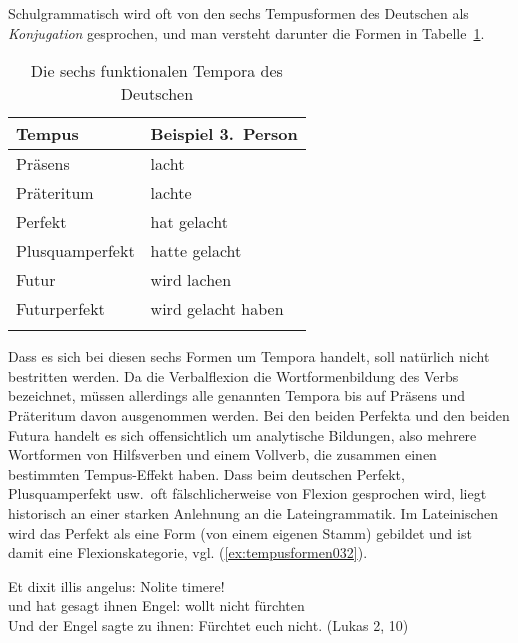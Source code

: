 Schulgrammatisch wird oft von den sechs Tempusformen des Deutschen als \textit{Konjugation} gesprochen, und man versteht darunter \idR die Formen in Tabelle~\ref{tab:tempusformen031}.

\begin{table}[!htbp]
  \centering
  \begin{tabular}{ll}
    \lsptoprule
    \textbf{Tempus} & \textbf{Beispiel 3.~Person}\\
    \midrule
    Präsens & lacht \\
    Präteritum & lachte \\
    Perfekt & hat gelacht \\
    Plusquamperfekt & hatte gelacht \\
    Futur & wird lachen \\
    Futurperfekt & wird gelacht haben \\
    \lspbottomrule
  \end{tabular}
  \caption{Die sechs funktionalen Tempora des Deutschen}
  \label{tab:tempusformen031}
\end{table}

Dass es sich bei diesen sechs Formen um Tempora handelt, soll natürlich nicht bestritten werden.
Da die Verbalflexion die Wortformenbildung des Verbs bezeichnet, müssen allerdings alle genannten Tempora bis auf Präsens und Präteritum davon ausgenommen werden.
Bei den beiden Perfekta und den beiden Futura handelt es sich offensichtlich um analytische Bildungen, also mehrere Wortformen von Hilfsverben und einem Vollverb, die zusammen einen bestimmten Tempus-Effekt haben.
Dass beim deutschen Perfekt, Plusquamperfekt usw.\ oft fälschlicherweise von Flexion gesprochen wird, liegt historisch an einer starken Anlehnung an die Lateingrammatik.
Im Lateinischen wird \zB das Perfekt als eine Form (von einem eigenen Stamm) gebildet und ist damit eine Flexionskategorie, vgl. (\ref{ex:tempusformen032}).

\begin{exe}
  \ex\label{ex:tempusformen032}\gll Et dixit illis angelus: Nolite timere!\\
  und {hat gesagt} ihnen {Engel}: {wollt nicht} fürchten\\
  \glt Und der Engel sagte zu ihnen: Fürchtet euch nicht. (Lukas 2, 10)
\end{exe}


